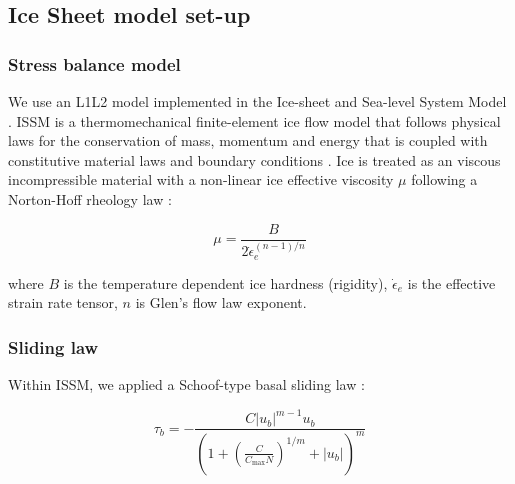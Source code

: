 \subsection{Ice Sheet model set-up}


\subsubsection{Stress balance model}

We use an L1L2 model \citep{Hindmarshnumericalcomparisonapproximations2004,SchoofThinFilmFlowsWall2010} implemented in the Ice-sheet and Sea-level System Model \citep[ISSM, version 4.18;][]{LarourContinentalscalehigh2012}.
ISSM is a thermomechanical finite-element ice flow model that follows physical laws for the conservation of mass, momentum and energy that is coupled with constitutive material laws and boundary conditions \citep{LarourContinentalscalehigh2012}.
Ice is treated as an viscous incompressible material \citep{Cuffeyphysicsglaciers2010} with a non-linear ice effective viscosity $\mu$ following a Norton-Hoff rheology law \citep[Glen's flow law,][]{Glencreeppolycrystallineice1955}:

\begin{equation}
  \mu = \frac{B}{2 \dot{\epsilon}_e^{(n-1)/n}}
\end{equation}

where $B$ is the temperature dependent ice hardness (rigidity), $\dot{\epsilon}_e$ is the effective strain rate tensor, $n$ is Glen's flow law exponent.

\subsubsection{Sliding law}

Within ISSM, we applied a Schoof-type basal sliding law \citep{Schoofeffectcavitationglacier2005}:


\begin{equation}
  \tau_b = -\frac{C |u_b|^{m-1} u_b}{\left(1 + \left(\frac{C}{C_{\text{max}}N}\right)^{1/m} + |u_b|\right)^m} \label{eq:schoof}
\end{equation}

